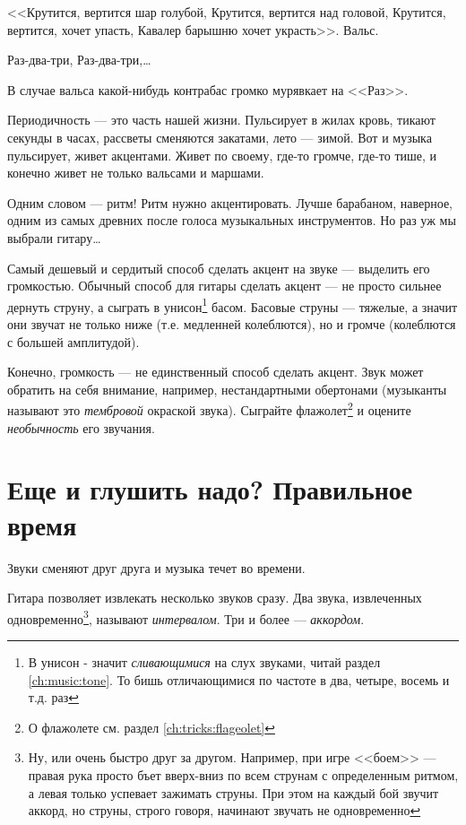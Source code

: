 <<Крутится, вертится шар голубой, Крутится, вертится над головой, Крутится, вертится, хочет упасть, Кавалер барышню хочет украсть>>. Вальс. 
\begin{center}
    Раз-два-три, Раз-два-три,\ldots 
\end{center}
В случае вальса какой-нибудь контрабас громко мурявкает на <<Раз>>.

Периодичность --- это часть нашей жизни. Пульсирует в жилах кровь, тикают секунды в часах, рассветы сменяются закатами, лето --- зимой. Вот и музыка пульсирует, живет акцентами. Живет по своему, где-то громче, где-то тише, и конечно живет не только вальсами и маршами.

Одним словом --- ритм! Ритм нужно акцентировать. Лучше барабаном, наверное, одним из самых древних после голоса музыкальных инструментов. Но раз уж мы выбрали гитару\ldots

Самый дешевый и сердитый способ сделать акцент на звуке --- выделить его громкостью. Обычный способ для гитары сделать акцент --- не просто сильнее дернуть струну, а сыграть в унисон\footnote{В унисон - значит \emph{сливающимися} на слух звуками, читай раздел \ref{ch:music:tone}. То бишь отличающимися по частоте в два, четыре, восемь и т.д. раз} басом. Басовые струны --- тяжелые, а значит они звучат не только ниже (т.е. медленней колеблются), но и громче (колеблются с большей амплитудой).

Конечно, громкость --- не единственный способ сделать акцент. Звук может обратить на себя внимание, например, нестандартными обертонами (музыканты называют это \emph{тембровой} окраской звука). Сыграйте флажолет\footnote{О флажолете см. раздел \ref{ch:tricks:flageolet}} и оцените \emph{необычность} его звучания.


\section{Еще и глушить надо? Правильное время}
\label{ch:music:rythm}

Звуки сменяют друг друга и музыка течет во времени. 

Гитара позволяет извлекать несколько звуков сразу. Два звука, извлеченных одновременно\footnote{Ну, или очень быстро друг за другом. Например, при игре <<боем>> --- правая рука просто бъет вверх-вниз по всем струнам с определенным ритмом, а левая только успевает зажимать струны. При этом на каждый бой звучит аккорд, но струны, строго говоря, начинают звучать не одновременно}, называют \emph{интервалом}. Три и более --- \emph{аккордом}.

